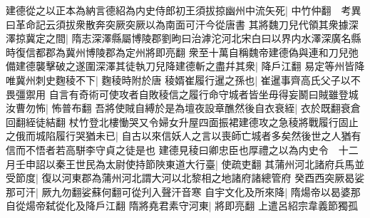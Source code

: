 建德從之以正本為納言德紹為内史侍郎初王須拔掠幽州中流矢死|{
	中竹仲翻　考異曰革命記云須拔衆散奔突厥突厥以為南面可汗今從唐書}
其將魏刀兒代領其衆據深澤掠冀定之間|{
	隋志深澤縣屬博陵郡劉昫曰治滹沱河北宋白曰以界内水澤深廣名縣時復信都郡為冀州博陵郡為定州將即亮翻}
衆至十萬自稱魏帝建德偽與連和刀兒弛備建德襲擊破之遂圍深澤其徒執刀兒降建德斬之盡幷其衆|{
	降戶江翻}
易定等州皆降唯冀州刺史麴稜不下|{
	麴稜時附於唐}
稜婿崔履行暹之孫也|{
	崔暹事齊高氏父子以不畏彊禦用}
自言有奇術可使攻者自敗稜信之履行命守城者皆坐毋得妄鬭曰賊雖登城汝曹勿怖|{
	怖普布翻}
吾將使賊自縛於是為壇夜設章醮然後自衣衰絰|{
	衣於既翻衰倉回翻絰徒結翻}
杖竹登北樓慟哭又令婦女升屋四面振裙建德攻之急稜將戰履行固止之俄而城陷履行哭猶未已|{
	自古以來信妖人之言以喪師亡城者多矣然後世之人猶有信而不悟者若高駢李守貞之徒是也}
建德見稜曰卿忠臣也厚禮之以為内史令　十二月壬申詔以秦王世民為太尉使持節陜東道大行臺|{
	使疏吏翻}
其蒲州河北諸府兵馬並受節度|{
	復以河東郡為蒲州河北謂大河以北黎相之地諸府諸總管府}
癸酉西突厥曷娑那可汗|{
	厥九勿翻娑蘇何翻可從刋入聲汗音寒}
自宇文化及所來降|{
	隋煬帝以曷婆那自從煬帝弑從化及降戶江翻}
隋將堯君素守河東|{
	將即亮翻}
上遣呂紹宗韋義節獨孤

